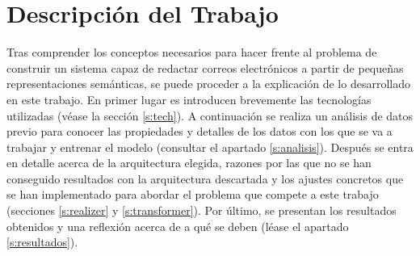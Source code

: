 \chapter{Descripción del Trabajo}
\label{cap:descripcionTrabajo}


Tras comprender los conceptos necesarios para hacer frente al problema de construir un sistema capaz de redactar correos electrónicos a partir de pequeñas representaciones semánticas, se puede proceder a la explicación de lo desarrollado en este trabajo. En primer lugar es introducen brevemente las tecnologías utilizadas (véase la sección \ref{s:tech}). A continuación se realiza un análisis de datos previo para conocer las propiedades y detalles de los datos con los que se va a trabajar y entrenar el modelo (consultar el apartado \ref{s:analisis}). Después se entra en detalle acerca de la arquitectura elegida, razones por las que no se han conseguido resultados con la arquitectura descartada y los ajustes concretos que se han implementado para abordar el problema que compete a este trabajo (secciones \ref{s:realizer} y \ref{s:transformer}). Por último, se presentan los resultados obtenidos y una reflexión acerca de a qué se deben (léase el apartado \ref{s:resultados}).





